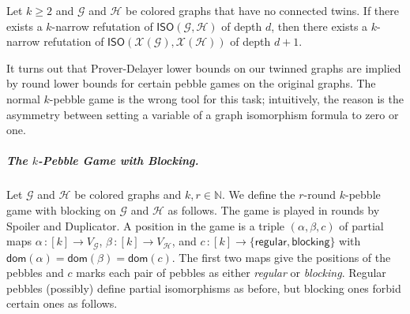\documentclass[a4paper,english, thm-restate]{lipics-v2021}
\newcommand{\defining}[1]{\emph{#1}}
\newcommand{\regular}{\mathsf{regular}}
\newcommand{\blocking}{\mathsf{blocking}}
\newcommand{\graphG}{\mathcal{G}}
\newcommand{\graphH}{\mathcal{H}}
\newcommand{\vertexG}{V_{\graphG}}
\newcommand{\vertexH}{V_{\graphH}}
\newcommand{\dom}{\mathsf{dom}}
\newcommand{\graphXG}{\mathcal{X}(\mathcal{G})}
\newcommand{\graphXH}{\mathcal{X}(\mathcal{H})}
\newcommand{\ISO}{\mathsf{ISO}(\graphG, \graphH)}
\newcommand{\XISO}{\mathsf{ISO}(\graphXG, \graphXH)}
\begin{document}
\begin{corollary} \label{cor: spoiler_win}
Let $k \ge 2$ and $\graphG$ and $\graphH$ be colored graphs that have no connected twins.
If there exists a $k$-narrow refutation of $\ISO$ of depth $d$,
then there exists a $k$-narrow refutation of $\XISO$ of depth $d+1$.
\end{corollary}

%
%
\noindent It turns out that Prover-Delayer lower bounds on our twinned graphs are implied by round lower bounds for certain pebble games on the original graphs. The normal $k$-pebble game is the wrong tool for this task; intuitively,
the reason is the asymmetry between setting a variable of a graph isomorphism formula to zero or one.

\subparagraph*{The \texorpdfstring{$k$}{k}-Pebble Game with Blocking.}

Let $\graphG$ and $\graphH$ be colored graphs and $k, r \in \mathbb{N}$. We define the $r$-round $k$-pebble game with blocking on $\graphG$ and  $\graphH$ as follows. The game is played in rounds by Spoiler and Duplicator. A position in the game is a triple 
$(\alpha, \beta, c)$ of partial maps $\alpha\, \colon [k] \to \vertexG $, $\beta \, \colon [k] \to \vertexH$, and $c \,\colon [k] \to \{\regular, \blocking\}$
with $\dom(\alpha) = \dom(\beta) = \dom(c)$.
The first two maps give the positions of the pebbles and $c$ marks each pair of pebbles as either \defining{regular} or \defining{blocking}.
Regular pebbles (possibly) define partial isomorphisms as before, but blocking ones forbid certain ones as follows.
\end{document}
